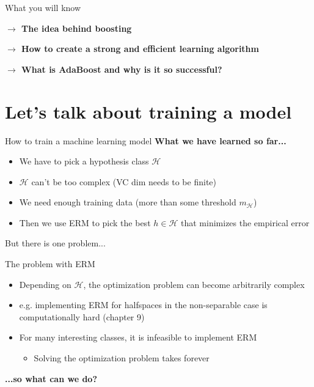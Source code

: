 \begin{frame}{What you will know}

    \textbf{$\rightarrow$ The idea behind boosting}
    
    \vspace{0.8cm}
    
    \pause

    \textbf{$\rightarrow$ How to create a strong and efficient learning algorithm}

    \vspace{0.8cm}
    
    \pause

    \textbf{$\rightarrow$ What is AdaBoost and why is it so successful?}
\end{frame}

\section{Let's talk about training a model}

\begin{frame}{How to train a machine learning model}
    \textbf{What we have learned so far...}    
    \begin{itemize}
        \item We have to pick a hypothesis class $\mathcal{H}$ \pause
        \item $\mathcal{H}$ can't be too complex (VC dim needs to be finite) \pause
        \item We need enough training data (more than some threshold $m_\mathcal{H}$) \pause
        \item Then we use ERM to pick the best $h \in \mathcal{H}$ that minimizes the empirical error \pause
    \end{itemize}
    But there is one problem...
\end{frame}

\begin{frame}{The problem with ERM}
\setlength{\fboxrule}{2pt}
    \begin{center}
    \end{center}

    \pause    
    
    \begin{itemize}
        \item Depending on $\mathcal{H}$, the optimization problem can become arbitrarily complex \pause
        \item e.g. implementing ERM for halfspaces in the non-separable case is computationally hard (chapter 9) \pause
        \item For many interesting classes, it is infeasible to implement ERM
        \begin{itemize}
            \item Solving the optimization problem takes forever
        \end{itemize}
    \end{itemize}

    \pause    
    
    \textbf{...so what can we do?}
\end{frame}

